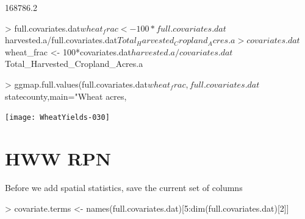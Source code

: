\documentclass{report}
\begin{document}
\begin{Schunk}
\begin{Soutput}
[1] 168786.2
\end{Soutput}
\begin{Sinput}
> full.covariates.dat$wheat_frac <- 100*full.covariates.dat$harvested.a/full.covariates.dat$Total_Harvested_Cropland_Acres.a
> covariates.dat$wheat_frac <- 100*covariates.dat$harvested.a/covariates.dat$Total_Harvested_Cropland_Acres.a
\end{Sinput}
\end{Schunk}

\begin{Schunk}
\begin{Sinput}
> ggmap.full.values(full.covariates.dat$wheat_frac,full.covariates.dat$statecounty,main="Wheat acres, %
\end{Sinput}
\end{Schunk}
\texttt{[image: WheatYields-030]}

\section*{HWW RPN}
Before we add spatial statistics, save the current set of columns
\begin{Schunk}
\begin{Sinput}
> covariate.terms <- names(full.covariates.dat)[5:dim(full.covariates.dat)[2]]
\end{Sinput}
\end{Schunk}
\end{document}

